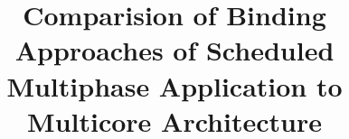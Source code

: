 \documentclass[10pt, conference]{IEEEtran}
\begin{document}
%
\title{Comparision of Binding Approaches of Scheduled Multiphase Application to Multicore Architecture}





% 
\end{document}
